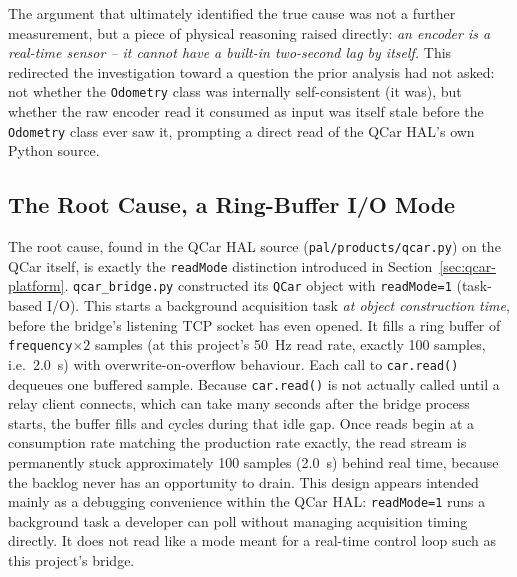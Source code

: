 The argument that ultimately identified the true cause was not a
further measurement, but a piece of physical reasoning raised
directly: \emph{an encoder is a real-time sensor -- it cannot have a
built-in two-second lag by itself.} This redirected the investigation
toward a question the prior analysis had not asked: not whether the
\texttt{Odometry} class was internally self-consistent (it was), but
whether the raw encoder read it consumed as input was itself stale
before the \texttt{Odometry} class ever saw it, prompting a direct
read of the QCar HAL's own Python source.

\subsection{The Root Cause, a Ring-Buffer I/O Mode}
\label{sec:readmode-rootcause}

The root cause, found in the QCar HAL source
(\texttt{pal/products/qcar.py}) on the QCar itself, is exactly the
\texttt{readMode} distinction introduced in
Section~\ref{sec:qcar-platform}. \texttt{qcar\_bridge.py} constructed
its \texttt{QCar} object with \texttt{readMode=1} (task-based I/O).
This starts a background acquisition task \emph{at object
construction time}, before the bridge's listening TCP socket has even
opened. It fills a ring buffer of \texttt{frequency}$\times 2$
samples (at this project's \SI{50}{\hertz} read rate, exactly 100
samples, i.e.\ \SI{2.0}{\second}) with overwrite-on-overflow
behaviour. Each call to \texttt{car.read()} dequeues one buffered
sample. Because \texttt{car.read()} is not actually called until a
relay client connects, which can take many seconds after the bridge
process starts, the buffer fills and cycles during that idle gap.
Once reads begin at a consumption rate matching the production rate
exactly, the read stream is permanently stuck approximately 100
samples (\SI{2.0}{\second}) behind real time, because the backlog
never has an opportunity to drain. This design appears intended
mainly as a debugging convenience within the QCar HAL:
\texttt{readMode=1} runs a background task a developer can poll
without managing acquisition timing directly. It does not read like a mode
meant for a real-time control loop such as this project's bridge.

